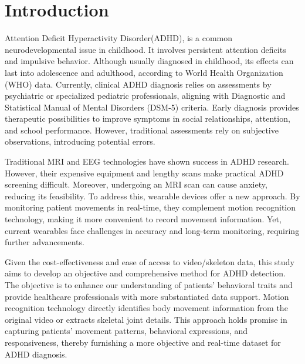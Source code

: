 \documentclass[conference,a4paper,english]{IEEEtran}[2015/08/26]
\begin{document}
\section{Introduction}
\label{sec:introduction}
Attention Deficit Hyperactivity Disorder(ADHD), is a common neurodevelopmental issue in childhood. 
It involves persistent attention deficits and impulsive behavior. Although usually diagnosed in childhood, its effects can last into adolescence and adulthood, according to World Health Organization (WHO) data. Currently, clinical ADHD diagnosis relies on assessments by psychiatric or specialized pediatric professionals, aligning with Diagnostic and Statistical Manual of Mental Disorders (DSM-5) criteria. Early diagnosis provides therapeutic possibilities to improve symptoms in social relationships, attention, and school performance. However, 
traditional assessments rely on subjective observations, introducing potential errors.


Traditional MRI and EEG technologies have shown success in ADHD research. However,
 their expensive equipment and lengthy scans make practical ADHD screening difficult. 
 Moreover, undergoing an MRI scan can cause anxiety, reducing its feasibility. 
 To address this, wearable devices offer a new approach. By monitoring patient movements in real-time, 
 they complement motion recognition technology, 
 making it more convenient to record movement information. 
 Yet, current wearables face challenges in accuracy and long-term monitoring,
 requiring further advancements.

 Given the cost-effectiveness and ease of access to video/skeleton data, 
 this study aims to develop an objective and comprehensive method for ADHD detection. 
 The objective is to enhance our understanding of patients' behavioral traits and provide healthcare 
 professionals with more substantiated data support. Motion recognition technology directly identifies 
 body movement information from the original video or extracts skeletal joint details. This approach 
 holds promise in capturing patients' movement patterns, behavioral expressions, 
 and responsiveness, thereby furnishing a more objective and real-time dataset for ADHD diagnosis.
\end{document}

